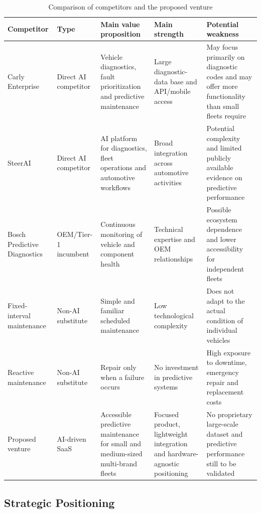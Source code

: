 \documentclass[11pt,a4paper]{article}
\begin{document}
\begin{table}[ht]
\centering
\caption{Comparison of competitors and the proposed venture}
\label{tab:competitor-comparison}
\small
\begin{tabularx}{\linewidth}{p{2.2cm} p{1.8cm} X X X}
\toprule
\textbf{Competitor} &
\textbf{Type} &
\textbf{Main value proposition} &
\textbf{Main strength} &
\textbf{Potential weakness} \\
\midrule

Carly Enterprise &
Direct AI competitor &
Vehicle diagnostics, fault prioritization and predictive maintenance &
Large diagnostic-data base and API/mobile access &
May focus primarily on diagnostic codes and may offer more functionality than small fleets require \\

SteerAI &
Direct AI competitor &
AI platform for diagnostics, fleet operations and automotive workflows &
Broad integration across automotive activities &
Potential complexity and limited publicly available evidence on predictive performance \\

Bosch Predictive Diagnostics &
OEM/Tier-1 incumbent &
Continuous monitoring of vehicle and component health &
Technical expertise and OEM relationships &
Possible ecosystem dependence and lower accessibility for independent fleets \\

Fixed-interval maintenance &
Non-AI substitute &
Simple and familiar scheduled maintenance &
Low technological complexity &
Does not adapt to the actual condition of individual vehicles \\

Reactive maintenance &
Non-AI substitute &
Repair only when a failure occurs &
No investment in predictive systems &
High exposure to downtime, emergency repair and replacement costs \\

Proposed venture &
AI-driven SaaS &
Accessible predictive maintenance for small and medium-sized multi-brand fleets &
Focused product, lightweight integration and hardware-agnostic positioning &
No proprietary large-scale dataset and predictive performance still to be validated \\

\bottomrule
\end{tabularx}
\end{table}

\subsection{Strategic Positioning}
\end{document}
